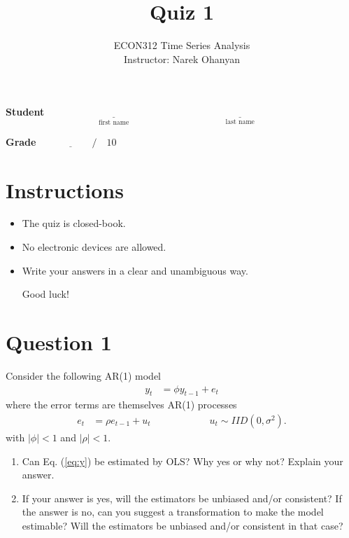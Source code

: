 \documentclass[12pt]{article}
\title{\textbf{Quiz 1}}
\author{ECON312 Time Series Analysis \\ Instructor: Narek Ohanyan}
\date{}
\begin{document}
\maketitle

\vspace{1cm}

\textbf{Student} $ \qquad \underset{\text{first name}}{\underline{\hspace{4cm}}} \quad \underset{\text{last name}}{\underline{\hspace{6cm}}}  $

\bigskip
\textbf{Grade} $ \qquad \underline{\hspace{1cm}} \quad / \quad 10 $


\vspace{1cm}

\section*{Instructions}

\begin{itemize}
    \item The quiz is closed-book.
    \item No electronic devices are allowed.
    \item Write your answers in a clear and unambiguous way.

    Good luck!
\end{itemize}


\newpage

\section*{Question 1 }

Consider the following AR(1) model
\begin{align}
    \label{eq:y}
    y_{t} & = \phi y_{t-1} + e_{t}
\end{align}
where the error terms are themselves AR(1) processes
\begin{align*}
    e_{t} & = \rho e_{t-1} + u_{t} \qquad\qquad\qquad u_{t} \sim IID(0,\sigma^2).
\end{align*}
with $ | \phi | < 1 $ and $ | \rho | < 1 $.

\begin{enumerate}
    \item Can Eq. (\ref{eq:y}) be estimated by OLS? Why yes or why not? Explain your answer.
    \vspace{5cm}
    \item If your answer is yes, will the estimators be unbiased and/or consistent? If the answer is no, can you suggest a transformation to make the model estimable? Will the estimators be unbiased and/or consistent in that case?
    \vspace{5cm}
\end{enumerate}

\end{document}
